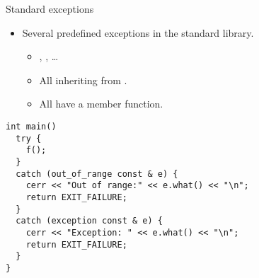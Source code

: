 \begin{frame}[t,fragile]{Standard exceptions}
\begin{itemize}
  \item Several predefined exceptions in the standard library.
    \begin{itemize}
      \item {}, , \ldots
      \item All inheriting from .
      \item All have a  member function.
    \end{itemize}
\end{itemize}
\begin{lstlisting}
int main()
  try {
    f();
  }
  catch (out_of_range const & e) {
    cerr << "Out of range:" << e.what() << "\n";
    return EXIT_FAILURE;
  }
  catch (exception const & e) {
    cerr << "Exception: " << e.what() << "\n";
    return EXIT_FAILURE;
  }
}
\end{lstlisting}
\end{frame}
